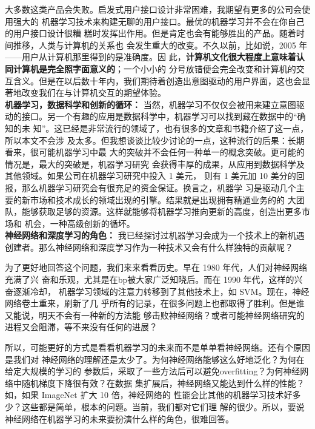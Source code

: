 大多数这类产品会失败。启发式用户接口设计非常困难，我期望有更多的公司会使用强大的
机器学习技术来构建无聊的用户接口。最优的机器学习并不会在你自己的用户接口设计很糟
糕时发挥出作用。但是肯定也会有能够胜出的产品。随着时间推移，人类与计算机的关系也
会发生重大的改变。不久以前，比如说，2005 年——用户从计算机那里得到的是准确度。因
此，\textbf{计算机文化很大程度上意味着认同计算机是完全照字面意义的}；一个小小的
分号放错便会完全改变和计算机的交互含义。但是在以后数十年内，我们期待着创造出意图驱动的用户界面，这也会显著地改变我们在与计算机交互的期望体验。\\

\textbf{机器学习，数据科学和创新的循环：} 当然，机器学习不仅仅会被用来建立意图驱
动的接口。另一个有趣的应用是数据科学中，机器学习可以找到藏在数据中的“确知的未
知”。这已经是非常流行的领域了，也有很多的文章和书籍介绍了这一点，所以本文不会涉
及太多。但我想谈谈比较少讨论的一点，这种流行的后果：长期看来，很可能机器学习中最
大的突破并不会任何一种单一的概念突破。更可能的情况是，最大的突破是，机器学习研究
会获得丰厚的成果，从应用到数据科学及其他领域。如果公司在机器学习研究中投入 1 美元，
则有 1 美元加 10 美分的回报，那么机器学习研究会有很充足的资金保证。换言之，机器学
习是驱动几个主要的新市场和技术成长的领域出现的引擎。结果就是出现拥有精通业务的的
大团队，能够获取足够的资源。这样就能够将机器学习推向更新的高度，创造出更多市场和
机会，一种高级创新的循坏。\\

\textbf{神经网络和深度学习的角色：} 我已经探讨过机器学习会成为一个技术上的新机遇
创建者。那么神经网络和深度学习作为一种技术又会有什么样独特的贡献呢？

为了更好地回答这个问题，我们来来看看历史。早在 1980 年代，人们对神经网络充满了兴
奋和乐观，尤其是在\gls*{bp}被大家广泛知晓后。而在 1990 年代，这样的兴奋逐渐冷却，
机器学习领域的注意力转移到了其他技术上，如 SVM。现在，神经网络卷土重来，刷新了几
乎所有的记录，在很多问题上也都取得了胜利。但是谁又能说，明天不会有一种新的方法能
够击败神经网络？或者可能神经网络研究的进程又会阻滞，等不来没有任何的进展？

所以，可能更好的方式是看看机器学习的未来而不是单单看神经网络。还有个原因是我们对
神经网络的理解还是太少了。为何神经网络能够这么好地泛化？为何在给定大规模的学习的
参数后，采取了一些方法后可以避免\gls*{overfitting}？为何神经网络中随机梯度下降很有效？在数据
集扩展后，神经网络又能达到什么样的性能？如，如果 ImageNet 扩大 10 倍，神经网络的
性能会比其他的机器学习技术好多少？这些都是简单，根本的问题。当前，我们都对它们理
解的很少。所以，要说神经网络在机器学习的未来要扮演什么样的角色，很难回答。

